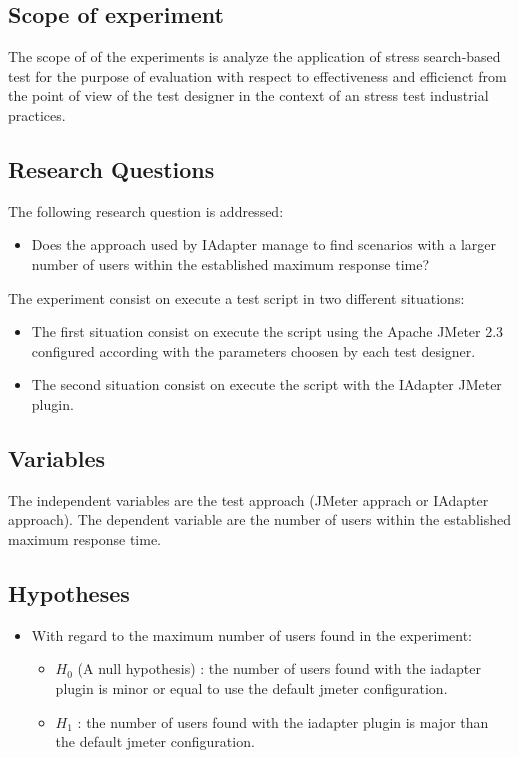 \subsection{Scope of experiment}

The scope of of the experiments is analyze the application of stress search-based test for the purpose of evaluation with respect to effectiveness and efficienct from the point of view of the test designer in the context of an stress test industrial practices.  

\subsection{Research Questions}

The following research question is addressed:
\begin{itemize}
\item Does the approach used by IAdapter manage to find scenarios with a larger number of users within the established maximum response time?
\end{itemize}

The experiment consist on execute a test script in two different situations:

\begin{itemize}
\item The first situation consist on execute the script using the Apache JMeter 2.3  configured according with the parameters choosen by each test designer.
\item The second situation consist on execute the script with the IAdapter JMeter plugin.
\end{itemize}

\subsection{Variables}

The independent variables are the test approach (JMeter apprach or IAdapter approach). The dependent variable are the number of users  within the established maximum response time.

\subsection{Hypotheses}

\begin{itemize}

\item With regard to the maximum number of users found in the experiment:

\begin{itemize}
\item $H_{0}$ (A null hypothesis) : the number of users found with the iadapter plugin is minor or equal to use the default jmeter configuration.
\item $H_{1}$  : the number of users found with the iadapter plugin is major than the default jmeter configuration.
\end{itemize}


\end{itemize}



